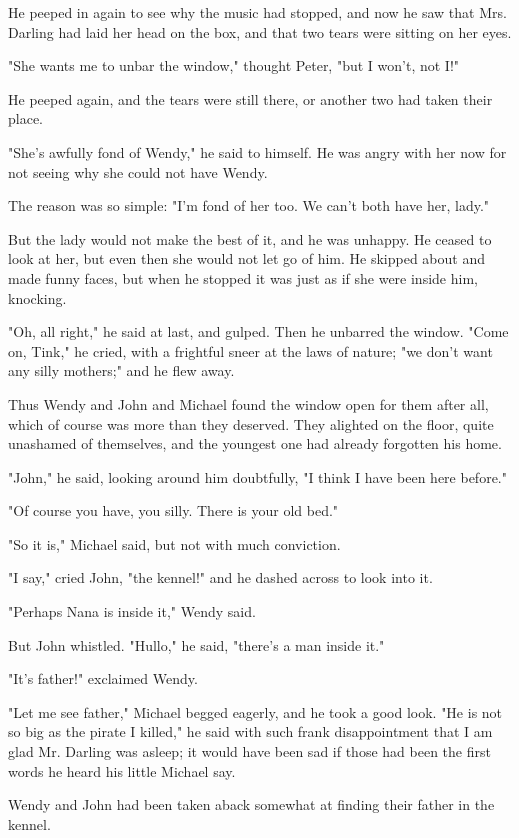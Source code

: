 He peeped in again to see why the music had stopped, and now he saw that
Mrs. Darling had laid her head on the box, and that two tears were sitting
on her eyes.


"She wants me to unbar the window," thought Peter, "but I won't, not I!"


He peeped again, and the tears were still there, or another two had taken
their place.


"She's awfully fond of Wendy," he said to himself. He was angry with her
now for not seeing why she could not have Wendy.


The reason was so simple: "I'm fond of her too. We can't both have her,
lady."


But the lady would not make the best of it, and he was unhappy. He ceased
to look at her, but even then she would not let go of him. He skipped
about and made funny faces, but when he stopped it was just as if she were
inside him, knocking.


"Oh, all right," he said at last, and gulped. Then he unbarred the window.
"Come on, Tink," he cried, with a frightful sneer at the laws of nature;
"we don't want any silly mothers;" and he flew away.


Thus Wendy and John and Michael found the window open for them after all,
which of course was more than they deserved. They alighted on the floor,
quite unashamed of themselves, and the youngest one had already forgotten
his home.


"John," he said, looking around him doubtfully, "I think I have been here
before."


"Of course you have, you silly. There is your old bed."


"So it is," Michael said, but not with much conviction.


"I say," cried John, "the kennel!" and he dashed across to look into it.


"Perhaps Nana is inside it," Wendy said.


But John whistled. "Hullo," he said, "there's a man inside it."


"It's father!" exclaimed Wendy.


"Let me see father," Michael begged eagerly, and he took a good look. "He
is not so big as the pirate I killed," he said with such frank
disappointment that I am glad Mr. Darling was asleep; it would have been
sad if those had been the first words he heard his little Michael say.


Wendy and John had been taken aback somewhat at finding their father in
the kennel.


